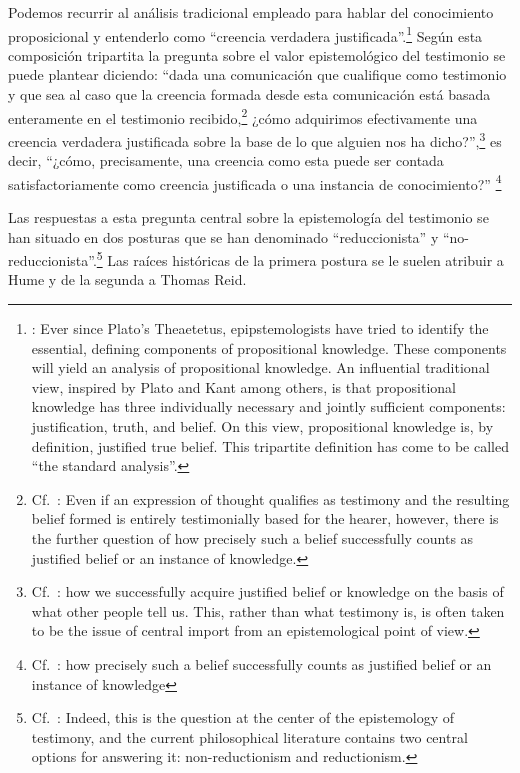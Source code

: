 Podemos recurrir al análisis tradicional empleado para hablar del conocimiento
proposicional y entenderlo como \enquote{creencia verdadera
  justificada}.\footnote{\cite[4]{moser2002ep}: Ever since Plato's Theaetetus,
  epipstemologists have tried to identify the essential, defining components of
  propositional knowledge. These components will yield an analysis of
  propositional knowledge. An influential traditional view, inspired by Plato
  and Kant among others, is that propositional knowledge has three individually
  necessary and jointly sufficient components: justification, truth, and belief.
  On this view, propositional knowledge is, by definition, justified true
  belief. This tripartite definition has come to be called ``the standard
  analysis''.} Según esta composición tripartita la pregunta sobre el valor
epistemológico del testimonio se puede plantear diciendo: \enquote{dada una
  comunicación que cualifique como testimonio y que sea al caso que la creencia
  formada desde esta comunicación está basada enteramente en el testimonio
  recibido,\footnote{Cf.~\cite[4]{lackeysosa2006eptest}: Even if an expression
    of thought qualifies as testimony and the resulting belief formed is
    entirely testimonially based for the hearer, however, there is the further
    question of how precisely such a belief successfully counts as justified
    belief or an instance of knowledge.} ¿cómo adquirimos efectivamente una
  creencia verdadera justificada sobre la base de lo que alguien nos ha
  dicho?},\footnote{Cf.~\cite[2]{lackeysosa2006eptest}: how we successfully
  acquire justified belief or knowledge on the basis of what other people tell
  us. This, rather than what testimony is, is often taken to be the issue of
  central import from an epistemological point of view.} es decir,
\enquote{¿cómo, precisamente, una creencia como esta puede ser contada
  satisfactoriamente como creencia justificada o una instancia de conocimiento?}
\footnote{Cf.~\cite[4]{lackeysosa2006eptest}: how precisely such a belief
  successfully counts as justified belief or an instance of knowledge}

Las respuestas a esta pregunta central sobre la epistemología del testimonio se
han situado en dos posturas que se han denominado \enquote{reduccionista} y
\enquote{no-reduccionista}.\footnote{Cf.~\cite[4]{lackeysosa2006eptest}: Indeed,
  this is the question at the center of the epistemology of testimony, and the
  current philosophical literature contains two central options for answering
  it: non-reductionism and reductionism.} Las raíces históricas de la primera
postura se le suelen atribuir a Hume y de la segunda a Thomas Reid.

